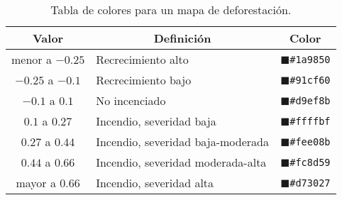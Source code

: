 \begin{enumerate}
\begin{table}[]
\centering
\begin{tabular}{@{}cll@{}}
\toprule
Valor              & \multicolumn{1}{c}{Definición}       & \multicolumn{1}{c}{Color}                        \\ \midrule
menor a $-0.25$    & Recrecimiento alto                   & \textcolor{NB1}{$\blacksquare$}\texttt{\#1a9850} \\
$-0.25$ a $-0.1$   & Recrecimiento bajo   		  & \textcolor{NB2}{$\blacksquare$}\texttt{\#91cf60} \\
$-0.1$ a $0.1$     & No incenciado     		 	  & \textcolor{NB3}{$\blacksquare$}\texttt{\#d9ef8b} \\
$0.1$ a $0.27$     & Incendio, severidad baja		  & \textcolor{NB4}{$\blacksquare$}\texttt{\#ffffbf} \\
$0.27$ a $0.44$    & Incendio, severidad baja-moderada    & \textcolor{NB5}{$\blacksquare$}\texttt{\#fee08b} \\
$0.44$ a $0.66$    & Incendio, severidad moderada-alta    & \textcolor{NB6}{$\blacksquare$}\texttt{\#fc8d59} \\
mayor a $0.66$     & Incendio, severidad alta             & \textcolor{NB7}{$\blacksquare$}\texttt{\#d73027} \\ \bottomrule
\end{tabular}
\caption{Tabla de colores para un mapa de deforestación.}
\label{tab:inc}
\end{table}
\end{enumerate}
%
%
%
%
